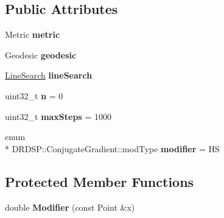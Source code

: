 \subsection*{Public Attributes}
\begin{DoxyCompactItemize}
\item 
\hypertarget{struct_d_r_d_s_p_1_1_conjugate_gradient_a1f7b00cedb7596ca2d5ddd9319970968}{Metric {\bfseries metric}}\label{struct_d_r_d_s_p_1_1_conjugate_gradient_a1f7b00cedb7596ca2d5ddd9319970968}

\item 
\hypertarget{struct_d_r_d_s_p_1_1_conjugate_gradient_a4d615b846d98b25b42595a9224984896}{Geodesic {\bfseries geodesic}}\label{struct_d_r_d_s_p_1_1_conjugate_gradient_a4d615b846d98b25b42595a9224984896}

\item 
\hypertarget{struct_d_r_d_s_p_1_1_conjugate_gradient_a63540dd317ba49a3cb74652e1843d468}{\hyperlink{struct_d_r_d_s_p_1_1_line_search}{Line\-Search} {\bfseries line\-Search}}\label{struct_d_r_d_s_p_1_1_conjugate_gradient_a63540dd317ba49a3cb74652e1843d468}

\item 
\hypertarget{struct_d_r_d_s_p_1_1_conjugate_gradient_a0fda11830e3613a899c21174c9bef987}{uint32\-\_\-t {\bfseries n} = 0}\label{struct_d_r_d_s_p_1_1_conjugate_gradient_a0fda11830e3613a899c21174c9bef987}

\item 
\hypertarget{struct_d_r_d_s_p_1_1_conjugate_gradient_a3d17de4607acfbd7bf82986350730f83}{uint32\-\_\-t {\bfseries max\-Steps} = 1000}\label{struct_d_r_d_s_p_1_1_conjugate_gradient_a3d17de4607acfbd7bf82986350730f83}

\item 
\hypertarget{struct_d_r_d_s_p_1_1_conjugate_gradient_a0370bc97e78073a487af5067a0f4f16e}{enum \\*
D\-R\-D\-S\-P\-::\-Conjugate\-Gradient\-::mod\-Type {\bfseries modifier} = H\-S}\label{struct_d_r_d_s_p_1_1_conjugate_gradient_a0370bc97e78073a487af5067a0f4f16e}

\end{DoxyCompactItemize}
\subsection*{Protected Member Functions}
\begin{DoxyCompactItemize}
\item 
\hypertarget{struct_d_r_d_s_p_1_1_conjugate_gradient_a68790da1a177ed56ce1db8a53f79e806}{double {\bfseries Modifier} (const Point \&x)}\label{struct_d_r_d_s_p_1_1_conjugate_gradient_a68790da1a177ed56ce1db8a53f79e806}

\end{DoxyCompactItemize}

